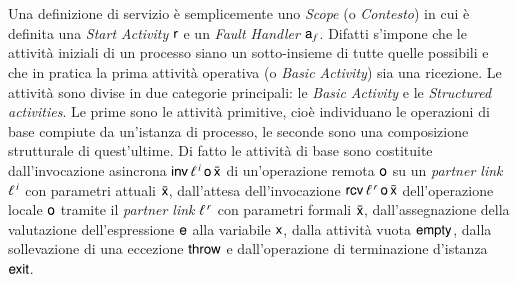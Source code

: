 Una definizione di servizio è semplicemente uno \emph{Scope} (o \emph{Contesto})
in cui è definita una \emph{Start Activity} ${\sf r}$ e un \emph{Fault Handler}
${\sf a}_f$. Difatti s'impone che le attività iniziali di un processo siano un
sotto-insieme di tutte quelle possibili e che in pratica la prima attività
operativa (o \emph{Basic Activity}) sia una ricezione. Le attività sono divise in
due categorie principali: le \emph{Basic Activity} e le \emph{Structured
activities}. Le prime sono le attività primitive, cioè individuano le operazioni
di base compiute da un'istanza di processo, le seconde sono una composizione
strutturale di quest'ultime. Di fatto le attività di base sono costituite
dall'invocazione asincrona ${\sf inv}\,\ell^{\,i}\,{\sf o}\,\bar{{\sf x}}$ di un'operazione
remota ${\sf o}$ su un \emph{partner link} $\ell^{\,i}$ con parametri attuali
$\bar{{\sf x}}$, dall'attesa dell'invocazione ${\sf rcv}\,\ell^{\,r}\, {\sf o}\, \bar{{\sf x}}$
dell'operazione locale ${\sf o}$ tramite il \emph{partner link} $\ell^{\,r}$ con
parametri formali ${\bar{{\sf x}}}$, dall'assegnazione della valutazione
dell'espressione ${\sf e}$ alla variabile ${\sf x}$, dalla attività vuota ${\sf empty}$, dalla
sollevazione di una eccezione ${\sf throw}$ e dall'operazione di terminazione
d'istanza ${\sf exit}$.

